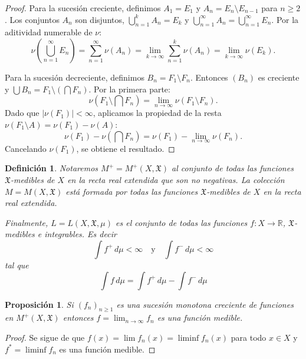 \documentclass[12pt,a4paper]{article}
\theoremstyle{profesional}
\newtheorem{proposicion}[teorema]{Proposición}
\theoremstyle{definicion-style}
\newtheorem{definicion}[teorema]{Definición}
\newcommand{\R}{\mathbb{R}}
\newcommand{\X}{\mathfrak{X}}
\begin{document}
\begin{proof}
    Para la sucesión creciente, definimos \( A_1 = E_1 \) y \( A_n = E_n \setminus E_{n-1} \) para \( n \geq 2 \). Los conjuntos \( A_n \) son disjuntos, \( \bigcup_{n=1}^k A_n = E_k \) y \( \bigcup_{n=1}^\infty A_n = \bigcup_{n=1}^\infty E_n \). Por la aditividad numerable de \( \nu \):
    \[
        \nu\left(\bigcup_{n=1}^\infty E_n\right) = \sum_{n=1}^\infty \nu(A_n) = \lim_{k \to \infty} \sum_{n=1}^k \nu(A_n) = \lim_{k \to \infty} \nu(E_k).
    \]

    Para la sucesión decreciente, definimos \( B_n = F_1 \setminus F_n \). Entonces \( (B_n) \) es creciente y \( \bigcup B_n = F_1 \setminus (\bigcap F_n) \). Por la primera parte:
    \[
        \nu\left(F_1 \setminus \bigcap F_n\right) = \lim_{n \to \infty} \nu(F_1 \setminus F_n).
    \]
    Dado que \( |\nu(F_1)| < \infty \), aplicamos la propiedad de la resta \( \nu(F_1 \setminus A) = \nu(F_1) - \nu(A) \):
    \[
        \nu(F_1) - \nu\left(\bigcap F_n\right) = \nu(F_1) - \lim_{n \to \infty} \nu(F_n).
    \]
    Cancelando \( \nu(F_1) \), se obtiene el resultado.
\end{proof}

\begin{definicion}
    Notaremos \( M^+ = M^+(X, \X) \) al conjunto de todas las funciones \( \X \)-medibles de \( X \) en la recta real extendida que son no negativas.
    La colección \( M = M(X, \X) \) está formada por todas las funciones \( \X \)-medibles de \( X \) en la recta real extendida.

    Finalmente, \( L = L(X, \X, \mu) \) es el conjunto de todas las funciones \( f : X \to \R \), \( \X \)-medibles e integrables. Es decir \[
        \int f^+ \, d\mu < \infty \quad \text{y} \quad \int f^- \, d\mu < \infty
    \] tal que \[
        \int f \, d \mu = \int f^+ \, d\mu - \int f^- \, d\mu
    \]
\end{definicion}

\begin{proposicion}\label{prop:monotona_creciente}
    Si \( {(f_n)}_{n \geq 1} \) es una sucesión monotona creciente de funciones en \( M^+(X, \X) \) entonces \( f = \lim_{n \to \infty} f_n \) es una función medible.
\end{proposicion}
\begin{proof}
    Se sigue de que \( f(x) = \lim f_n(x) = \liminf f_n(x) \) para todo \( x \in X \) y \( f^* = \liminf f_n \) es una función medible.
\end{proof}
\end{document}
